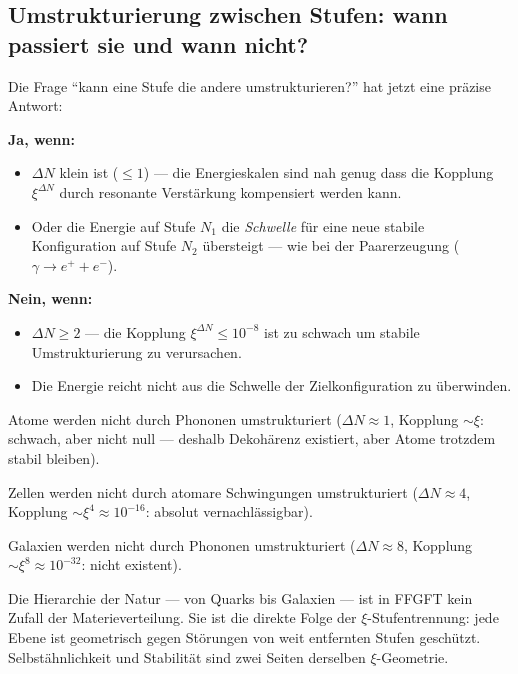 \subsection{Umstrukturierung zwischen Stufen:
  wann passiert sie und wann nicht?}

Die Frage ``kann eine Stufe die andere umstrukturieren?''
hat jetzt eine präzise Antwort:

\textbf{Ja, wenn:}
\begin{itemize}
  \item $\Delta N$ klein ist ($\leq 1$) --- die Energieskalen
    sind nah genug dass die Kopplung $\xi^{\Delta N}$
    durch resonante Verstärkung kompensiert werden kann.
  \item Oder die Energie auf Stufe $N_1$ die
    \emph{Schwelle} für eine neue stabile Konfiguration
    auf Stufe $N_2$ übersteigt ---
    wie bei der Paarerzeugung ($\gamma \to e^+ + e^-$).
\end{itemize}

\textbf{Nein, wenn:}
\begin{itemize}
  \item $\Delta N \geq 2$ --- die Kopplung
    $\xi^{\Delta N} \leq 10^{-8}$ ist zu schwach
    um stabile Umstrukturierung zu verursachen.
  \item Die Energie reicht nicht aus die Schwelle
    der Zielkonfiguration zu überwinden.
\end{itemize}

\begin{keypoint}
Atome werden nicht durch Phononen umstrukturiert
($\Delta N \approx 1$, Kopplung $\sim \xi$: schwach,
aber nicht null --- deshalb Dekohärenz existiert,
aber Atome trotzdem stabil bleiben).

Zellen werden nicht durch atomare Schwingungen
umstrukturiert ($\Delta N \approx 4$,
Kopplung $\sim \xi^4 \approx 10^{-16}$:
absolut vernachlässigbar).

Galaxien werden nicht durch Phononen umstrukturiert
($\Delta N \approx 8$,
Kopplung $\sim \xi^8 \approx 10^{-32}$:
nicht existent).

Die Hierarchie der Natur --- von Quarks bis Galaxien ---
ist in FFGFT kein Zufall der Materieverteilung.
Sie ist die direkte Folge der $\xi$-Stufentrennung:
jede Ebene ist geometrisch gegen Störungen
von weit entfernten Stufen geschützt.
Selbstähnlichkeit und Stabilität sind
zwei Seiten derselben $\xi$-Geometrie.
\end{keypoint}

